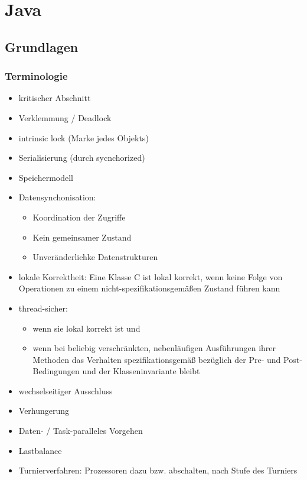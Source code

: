 \section{Java}
\subsection{Grundlagen}
\subsubsection{Terminologie}
\begin{itemize}
	\item kritischer Abschnitt
	\item Verklemmung / Deadlock
	\item intrinsic lock (Marke jedes Objekts)
	\item Serialisierung (durch sycnchorized)
	\item Speichermodell
	\item Datensynchonisation: 
		\begin{itemize} 
			\item Koordination der Zugriffe
			\item Kein gemeinsamer Zustand
			\item Unveränderlichke Datenstrukturen
		\end{itemize}
	\item lokale Korrektheit: Eine Klasse C ist lokal korrekt, wenn keine Folge von Operationen zu einem nicht-spezifikationsgemäßen Zustand führen kann
	\item thread-sicher:
		\begin{itemize}
			\item wenn sie lokal korrekt ist und
			\item wenn bei beliebig verschränkten, nebenläufigen Ausführungen ihrer Methoden das Verhalten spezifikationsgemäß bezüglich der Pre- und Post-Bedingungen und der Klasseninvariante bleibt
		\end{itemize}
	\item wechselseitiger Ausschluss
	\item Verhungerung
	\item Daten- / Task-paralleles Vorgehen
	\item Lastbalance
	\item Turnierverfahren: Prozessoren dazu bzw. abschalten, nach Stufe des Turniers
\end{itemize}
